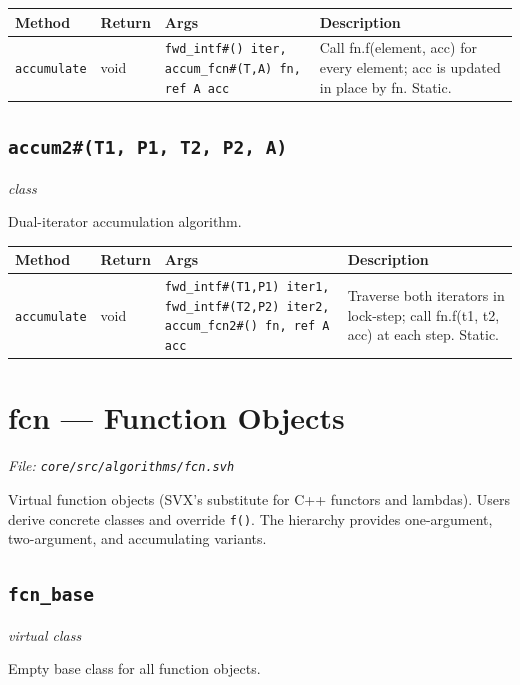 \documentclass[11pt,letterpaper]{report}
\begin{document}
\begin{xltabular}{\linewidth}{>{\small}p{1.35in} >{\small}p{1.25in} >{\small}p{0.95in} >{\small}X}
\toprule
\textbf{Method} & \textbf{Return} & \textbf{Args} & \textbf{Description} \\
\midrule
\endhead
\bottomrule
\endfoot
\texttt{accumulate} & void & \texttt{fwd\_intf\#() iter, accum\_fcn\#(T,A) fn, ref A acc} & Call fn.f(element, acc) for every element; acc is updated in place by fn. Static. \\
\end{xltabular}

\subsection*{\texttt{accum2\#(T1, P1, T2, P2, A)}}
\noindent\small\textit{class}\par

Dual-iterator accumulation algorithm.

\begin{xltabular}{\linewidth}{>{\small}p{1.35in} >{\small}p{1.25in} >{\small}p{0.95in} >{\small}X}
\toprule
\textbf{Method} & \textbf{Return} & \textbf{Args} & \textbf{Description} \\
\midrule
\endhead
\bottomrule
\endfoot
\texttt{accumulate} & void & \texttt{fwd\_intf\#(T1,P1) iter1, fwd\_intf\#(T2,P2) iter2, accum\_fcn2\#() fn, ref A acc} & Traverse both iterators in lock-step; call fn.f(t1, t2, acc) at each step. Static. \\
\end{xltabular}

\section{fcn --- Function Objects}
\noindent\small\textit{File: \texttt{core/src/algorithms/fcn.svh}}\par

Virtual function objects (SVX's substitute for C++ functors and lambdas). Users derive concrete classes and override \texttt{f()}. The hierarchy provides one-argument, two-argument, and accumulating variants.

\subsection*{\texttt{fcn\_base}}
\noindent\small\textit{virtual class}\par

Empty base class for all function objects.
\end{document}

